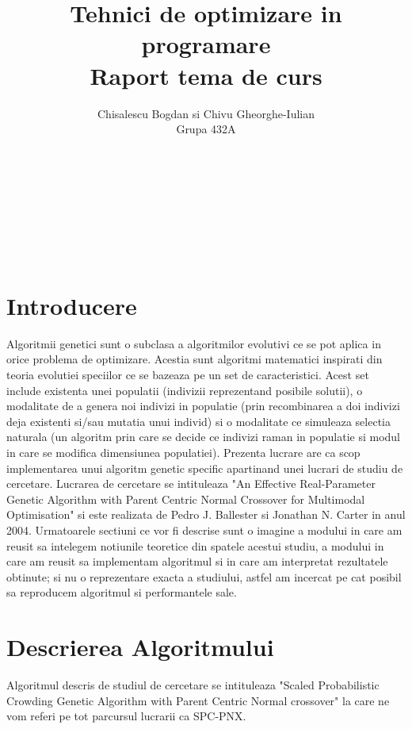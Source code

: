 \documentclass[a4paper]{article}
\title{\huge Tehnici de optimizare in programare
\\Raport tema de curs
}
\author{Chisalescu Bogdan  si  Chivu Gheorghe-Iulian
\\ Grupa 432A
}
\date{}
\begin{document}
\maketitle
\vphantom{} \\ \\ \\ \\ \\
\section{Introducere}
\Large 
Algoritmii genetici sunt o subclasa a algoritmilor evolutivi ce se pot aplica in orice problema de optimizare. Acestia sunt algoritmi matematici inspirati din teoria evolutiei speciilor ce se bazeaza pe un set de caracteristici. Acest set include existenta unei populatii (indivizii reprezentand posibile solutii), o modalitate de a genera noi indivizi in populatie (prin recombinarea a doi indivizi deja existenti si/sau mutatia unui individ) si o modalitate ce simuleaza selectia naturala (un algoritm prin care se decide ce indivizi raman in populatie si modul in care se modifica dimensiunea populatiei).
\newline
Prezenta lucrare are ca scop implementarea unui algoritm genetic specific apartinand unei lucrari de studiu de cercetare. Lucrarea de cercetare se intituleaza "An Effective Real-Parameter Genetic Algorithm with Parent Centric Normal Crossover for Multimodal Optimisation" si este realizata de Pedro J. Ballester si Jonathan N. Carter in anul 2004. 
\newline
Urmatoarele sectiuni ce vor fi descrise sunt o imagine a modului in care am reusit sa intelegem notiunile teoretice din spatele acestui studiu, a modului in care am reusit sa implementam algoritmul si in care am interpretat rezultatele obtinute; si nu o reprezentare exacta a studiului, astfel am incercat pe cat posibil sa reproducem algoritmul si performantele sale.
\newpage

\section{Descrierea Algoritmului}

Algoritmul descris de studiul de cercetare se intituleaza "Scaled Probabilistic Crowding Genetic Algorithm with Parent Centric Normal crossover" la care ne vom referi pe tot parcursul lucrarii ca SPC-PNX. 
\end{document}
